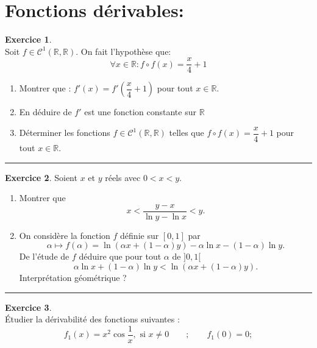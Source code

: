 \documentclass[a4paper,10pt]{article}
\theoremstyle{definition}
\theoremstyle{definition}
\newtheorem{exo}{Exercice}
\newcommand{\R}{\mathbb{R}}
\begin{document}
\section*{Fonctions dérivables:}
\begin{minipage}{1\linewidth}
\begin{minipage}[t]{0.48\linewidth}
\raggedright



\begin{exo}\quad\\
\noindent Soit $f\in\mathcal{C}^1\left(\R,\R\right)$. On fait l'hypothèse que:
 $$\forall x\in\R : f\circ f\left(x\right) = \dfrac{x}{4} +1$$
 \begin{enumerate}
\item Montrer que : $f'(x) = f'\left( \dfrac{x}{4} +1\right)  $ pour tout $x\in\R$.
\item En déduire de $f'$ est une fonction constante sur $\R$
\item Déterminer les fonctions $f\in\mathcal{C}^1\left(\R,\R\right)$ telles que $f\circ f\left(x\right) = \dfrac{x}{4} +1$ pour tout $x\in\R$.
 \end{enumerate}
\centering
\rule{1\linewidth}{0.6pt}
\end{exo}

\begin{exo}
Soient $x$ et $y$ r\'eels avec $0<x<y$.
\begin{enumerate}
    \item Montrer que
$$ x < \frac{y-x}{\ln y - \ln x} < y.$$
    \item On consid\`ere la fonction $f$ d\'efinie sur
$[0,1]$ par
$$\alpha \mapsto f(\alpha) = \ln (\alpha x +(1-\alpha)y)-\alpha
\ln x -(1-\alpha)\ln y.$$
De l'\'etude de $f$ d\'eduire que pour tout $\alpha$ de $]0,1[$
$$ \alpha
\ln x +(1-\alpha)\ln y < \ln (\alpha x +(1-\alpha)y) .$$
Interpr\'etation g\'eom\'etrique ?
\end{enumerate}


\centering
\rule{1\linewidth}{0.6pt}
\end{exo}








\end{minipage}	
\hfill\vrule\hfill
\begin{minipage}[t]{0.48\linewidth}
\raggedright

\begin{exo}\quad\\
\'Etudier  la d\'erivabilit\'e des fonctions suivantes :
$$f_1(x)=x^2\cos \frac{1}{x}, \text{\ \  si }x\not=0 \qquad ; \qquad f_1(0)=0 ;$$


\end{exo}
\end{minipage}
\end{minipage}
\end{document}
